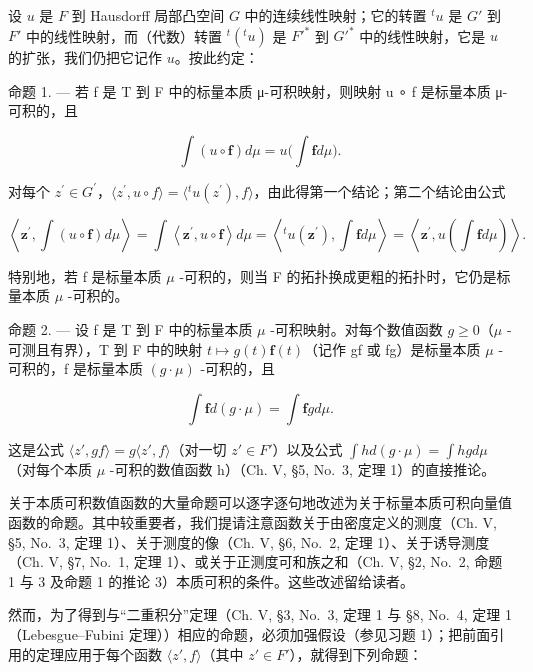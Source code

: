 设 \(u\) 是 \(F\) 到 Hausdorff 局部凸空间 \(G\) 中的连续线性映射；它的转置 \(^{t}u\) 是 \(G'\) 到 \(F'\) 中的线性映射，而（代数）转置 \(^{t}(^{t}u)\) 是 \(F'^{*}\) 到 \(G'^{*}\) 中的线性映射，它是 \(u\) 的扩张，我们仍把它记作 \(u\)。按此约定：

命题 1. --- 若 f 是 T 到 F 中的标量本质 μ-可积映射，则映射 u ∘ f 是标量本质 μ-可积的，且

\[
\int (u \circ \mathbf {f}) d \mu = u \Big (\int \mathbf {f} d \mu \Big).
\]

对每个 \(z^{\prime} \in G^{\prime}\)，\(\langle z^{\prime}, u \circ f \rangle = \langle {}^{t} u(z^{\prime}), f \rangle\)，由此得第一个结论；第二个结论由公式

\[
\left\langle \mathbf {z} ^ {\prime}, \int (u \circ \mathbf {f}) d \mu \right\rangle = \int \left\langle \mathbf {z} ^ {\prime}, u \circ \mathbf {f} \right\rangle d \mu = \left\langle {} ^ {t} u (\mathbf {z} ^ {\prime}), \int \mathbf {f} d \mu \right\rangle = \left\langle \mathbf {z} ^ {\prime}, u \left(\int \mathbf {f} d \mu\right) \right\rangle .
\]

特别地，若 f 是标量本质 \(\mu\) -可积的，则当 F 的拓扑换成更粗的拓扑时，它仍是标量本质 \(\mu\) -可积的。

命题 2. --- 设 f 是 T 到 F 中的标量本质 \(\mu\) -可积映射。对每个数值函数 \(g \geqslant 0\)（\(\mu\) -可测且有界），T 到 F 中的映射 \(t \mapsto g(t)\mathbf{f}(t)\)（记作 gf 或 fg）是标量本质 \(\mu\) -可积的，f 是标量本质 \((g \cdot \mu)\) -可积的，且

\[
\int \mathbf {f} d (g \cdot \mu) = \int \mathbf {f} g d \mu .
\]

这是公式 \(\langle z', gf\rangle = g\langle z', f\rangle\)（对一切 \(z' \in F'\)）以及公式 \(\int h d(g \cdot \mu) = \int hg d\mu\)（对每个本质 \(\mu\) -可积的数值函数 h）（Ch. V, §5, No.~3, 定理 1）的直接推论。

关于本质可积数值函数的大量命题可以逐字逐句地改述为关于标量本质可积向量值函数的命题。其中较重要者，我们提请注意函数关于由密度定义的测度（Ch. V, §5, No.~3, 定理 1）、关于测度的像（Ch. V, §6, No.~2, 定理 1）、关于诱导测度（Ch. V, §7, No.~1, 定理 1）、或关于正测度可和族之和（Ch. V, §2, No.~2, 命题 1 与 3 及命题 1 的推论 3）本质可积的条件。这些改述留给读者。

然而，为了得到与“二重积分”定理（Ch. V, §3, No.~3, 定理 1 与 §8, No.~4, 定理 1（Lebesgue--Fubini 定理））相应的命题，必须加强假设（参见习题 1）；把前面引用的定理应用于每个函数 \(\langle z', f \rangle\)（其中 \(z' \in F'\)），就得到下列命题：

